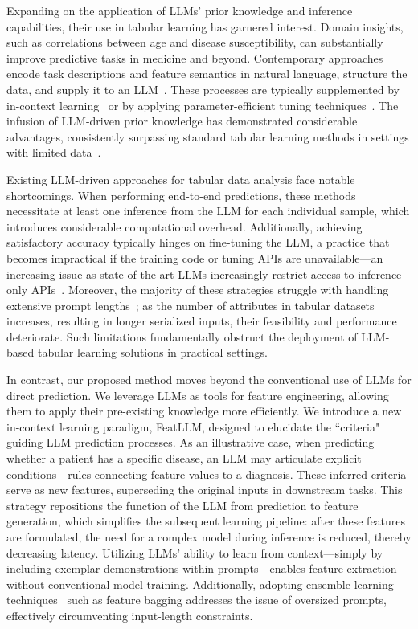 Expanding on the application of LLMs’ prior knowledge and inference capabilities, their use in tabular learning has garnered interest. Domain insights, such as correlations between age and disease susceptibility, can substantially improve predictive tasks in medicine and beyond. Contemporary approaches encode task descriptions and feature semantics in natural language, structure the data, and supply it to an LLM~\cite{dinh2022lift,wang2023anypredict}. These processes are typically supplemented by in-context learning~\cite{nam2023semi} or by applying parameter-efficient tuning techniques~\cite{dinh2022lift,hegselmann2023tabllm}. The infusion of LLM-driven prior knowledge has demonstrated considerable advantages, consistently surpassing standard tabular learning methods in settings with limited data~\cite{hegselmann2023tabllm}.

Existing LLM-driven approaches for tabular data analysis face notable shortcomings. When performing end-to-end predictions, these methods necessitate at least one inference from the LLM for each individual sample, which introduces considerable computational overhead. Additionally, achieving satisfactory accuracy typically hinges on fine-tuning the LLM, a practice that becomes impractical if the training code or tuning APIs are unavailable—an increasing issue as state-of-the-art LLMs increasingly restrict access to inference-only APIs~\cite{anil2023palm,openai2023gpt4}. Moreover, the majority of these strategies struggle with handling extensive prompt lengths~\cite{liu2023lost}; as the number of attributes in tabular datasets increases, resulting in longer serialized inputs, their feasibility and performance deteriorate. Such limitations fundamentally obstruct the deployment of LLM-based tabular learning solutions in practical settings.

In contrast, our proposed method moves beyond the conventional use of LLMs for direct prediction. We leverage LLMs as tools for feature engineering, allowing them to apply their pre-existing knowledge more efficiently. We introduce a new in-context learning paradigm, \textsf{FeatLLM}, designed to elucidate the ``criteria" guiding LLM prediction processes. As an illustrative case, when predicting whether a patient has a specific disease, an LLM may articulate explicit conditions—rules connecting feature values to a diagnosis. These inferred criteria serve as new features, superseding the original inputs in downstream tasks. This strategy repositions the function of the LLM from prediction to feature generation, which simplifies the subsequent learning pipeline: after these features are formulated, the need for a complex model during inference is reduced, thereby decreasing latency. Utilizing LLMs' ability to learn from context—simply by including exemplar demonstrations within prompts—enables feature extraction without conventional model training. Additionally, adopting ensemble learning techniques~\cite{breiman2001random} such as feature bagging addresses the issue of oversized prompts, effectively circumventing input-length constraints.

